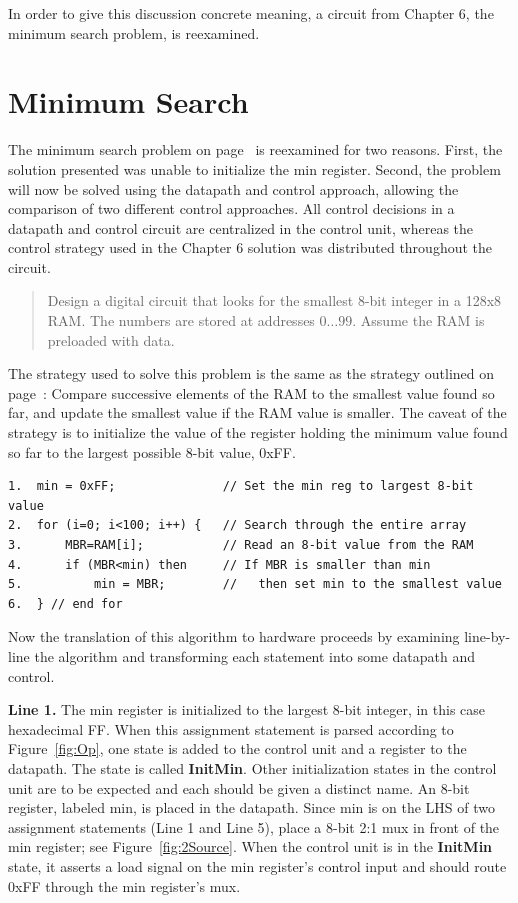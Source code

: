 In order to give this discussion concrete meaning, a circuit from Chapter
6, the minimum search problem, is reexamined.


\section{Minimum Search}

The minimum search problem on page~\pageref{page:minsearch} is reexamined 
for two reasons.  First, the solution presented was unable to initialize
the min register.  Second, the problem will now be solved using the 
datapath and control approach, allowing the comparison of two different 
control approaches.  All control
decisions in a datapath and control circuit are centralized in 
the control unit, whereas the control strategy used in the Chapter 
6 solution was distributed throughout the circuit.

\begin{quote}
Design a digital circuit that looks for the smallest 8-bit integer 
in a 128x8 RAM.  The numbers are stored at addresses 
$0\ldots 99$. Assume the RAM is preloaded with data.
\end{quote}

The strategy used to solve this problem is the same as the strategy
outlined on page~\pageref{page:minsearch}: Compare successive elements
of the RAM to the smallest value found so far, and update the smallest value
if the RAM value is smaller.  The caveat of the strategy is to 
initialize the value of the register holding
the minimum value found so far to the largest
possible 8-bit value, 0xFF.

\begin{verbatim}
1.  min = 0xFF;               // Set the min reg to largest 8-bit value
2.  for (i=0; i<100; i++) {   // Search through the entire array
3.      MBR=RAM[i];           // Read an 8-bit value from the RAM
4.      if (MBR<min) then     // If MBR is smaller than min
5.          min = MBR;        //   then set min to the smallest value
6.  } // end for
\end{verbatim}

Now the translation of this algorithm to hardware proceeds by examining
line-by-line the algorithm and transforming each statement into some datapath
and control.

{\bf Line 1.} The min register is initialized to the largest 8-bit integer,
in this case hexadecimal FF.  When this assignment statement is parsed
according to Figure~\ref{fig:Op}, one state is added to
the control unit and a register to the datapath.  The state is called
{\bf InitMin}. Other initialization states in the 
control unit are to be expected and each should be given a distinct name.  An 8-bit 
register, labeled min, is placed in the datapath.  Since min is on the 
LHS of two assignment statements (Line 1 and Line 5), place a 8-bit 2:1 
mux in front of the min register; see Figure~\ref{fig:2Source}.  When
the control unit is in the {\bf InitMin} state, it asserts a load
signal on the min register's control input and should route 0xFF through
the min register's mux.

